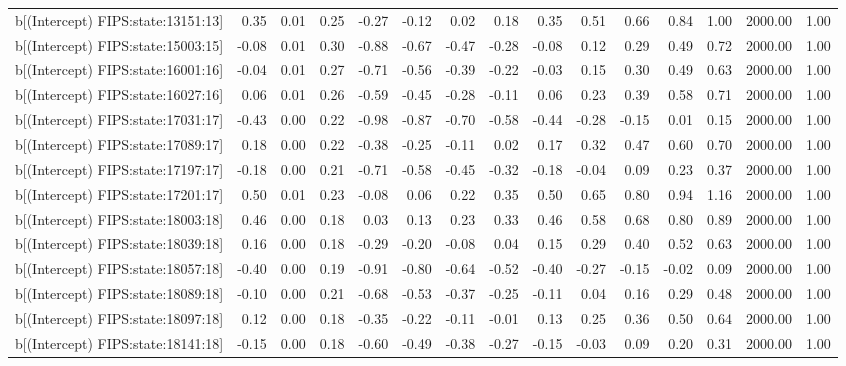 \begin{table}[ht]
\begin{tabular}{rrrrrrrrrrrrrrr}
  b[(Intercept) FIPS:state:13151:13] & 0.35 & 0.01 & 0.25 & -0.27 & -0.12 & 0.02 & 0.18 & 0.35 & 0.51 & 0.66 & 0.84 & 1.00 & 2000.00 & 1.00 \\ 
  b[(Intercept) FIPS:state:15003:15] & -0.08 & 0.01 & 0.30 & -0.88 & -0.67 & -0.47 & -0.28 & -0.08 & 0.12 & 0.29 & 0.49 & 0.72 & 2000.00 & 1.00 \\ 
  b[(Intercept) FIPS:state:16001:16] & -0.04 & 0.01 & 0.27 & -0.71 & -0.56 & -0.39 & -0.22 & -0.03 & 0.15 & 0.30 & 0.49 & 0.63 & 2000.00 & 1.00 \\ 
  b[(Intercept) FIPS:state:16027:16] & 0.06 & 0.01 & 0.26 & -0.59 & -0.45 & -0.28 & -0.11 & 0.06 & 0.23 & 0.39 & 0.58 & 0.71 & 2000.00 & 1.00 \\ 
  b[(Intercept) FIPS:state:17031:17] & -0.43 & 0.00 & 0.22 & -0.98 & -0.87 & -0.70 & -0.58 & -0.44 & -0.28 & -0.15 & 0.01 & 0.15 & 2000.00 & 1.00 \\ 
  b[(Intercept) FIPS:state:17089:17] & 0.18 & 0.00 & 0.22 & -0.38 & -0.25 & -0.11 & 0.02 & 0.17 & 0.32 & 0.47 & 0.60 & 0.70 & 2000.00 & 1.00 \\ 
  b[(Intercept) FIPS:state:17197:17] & -0.18 & 0.00 & 0.21 & -0.71 & -0.58 & -0.45 & -0.32 & -0.18 & -0.04 & 0.09 & 0.23 & 0.37 & 2000.00 & 1.00 \\ 
  b[(Intercept) FIPS:state:17201:17] & 0.50 & 0.01 & 0.23 & -0.08 & 0.06 & 0.22 & 0.35 & 0.50 & 0.65 & 0.80 & 0.94 & 1.16 & 2000.00 & 1.00 \\ 
  b[(Intercept) FIPS:state:18003:18] & 0.46 & 0.00 & 0.18 & 0.03 & 0.13 & 0.23 & 0.33 & 0.46 & 0.58 & 0.68 & 0.80 & 0.89 & 2000.00 & 1.00 \\ 
  b[(Intercept) FIPS:state:18039:18] & 0.16 & 0.00 & 0.18 & -0.29 & -0.20 & -0.08 & 0.04 & 0.15 & 0.29 & 0.40 & 0.52 & 0.63 & 2000.00 & 1.00 \\ 
  b[(Intercept) FIPS:state:18057:18] & -0.40 & 0.00 & 0.19 & -0.91 & -0.80 & -0.64 & -0.52 & -0.40 & -0.27 & -0.15 & -0.02 & 0.09 & 2000.00 & 1.00 \\ 
  b[(Intercept) FIPS:state:18089:18] & -0.10 & 0.00 & 0.21 & -0.68 & -0.53 & -0.37 & -0.25 & -0.11 & 0.04 & 0.16 & 0.29 & 0.48 & 2000.00 & 1.00 \\ 
  b[(Intercept) FIPS:state:18097:18] & 0.12 & 0.00 & 0.18 & -0.35 & -0.22 & -0.11 & -0.01 & 0.13 & 0.25 & 0.36 & 0.50 & 0.64 & 2000.00 & 1.00 \\ 
  b[(Intercept) FIPS:state:18141:18] & -0.15 & 0.00 & 0.18 & -0.60 & -0.49 & -0.38 & -0.27 & -0.15 & -0.03 & 0.09 & 0.20 & 0.31 & 2000.00 & 1.00 \\ 

\end{tabular}
\end{table}
